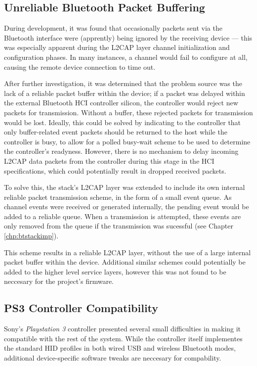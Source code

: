 \subsection{Unreliable Bluetooth Packet Buffering}

During development, it was found that occasionally packets sent via the Bluetooth interface were (apprently) being ignored by the receiving device --- this was especially apparent during the L2CAP layer channel initialization and configuration phases. In many instances, a channel would fail to configure at all, causing the remote device connection to time out.

After further investigation, it was determined that the problem source was the lack of a reliable packet buffer within the device; if a packet was delayed within the external Bluetooth HCI controller silicon, the controller would reject new packets for transmission. Without a buffer, these rejected packets for transmission would be lost. Ideally, this could be solved by indicating to the controller that only buffer-related event packets should be returned to the host while the controller is busy, to allow for a polled busy-wait scheme to be used to determine the controller's readyness. However, there is no mechanism to delay incoming L2CAP data packets from the controller during this stage in the HCI specifications, which could potentially result in dropped received packets.

To solve this, the stack's L2CAP layer was extended to include its own internal reliable packet transmission scheme, in the form of a small event queue. As channel events were received or generated internally, the pending event would be added to a reliable queue. When a transmission is attempted, these events are only removed from the queue if the transmission was sucessful (see Chapter \ref{chp:btstackimp}).

This scheme results in a reliable L2CAP layer, without the use of a large internal packet buffer within the device. Additional similar schemes could potentially be added to the higher level service layers, however this was not found to be neccesary for the project's firmware.

\subsection{PS3 Controller Compatibility}

Sony's \textit{Playstation 3} controller presented several small difficulties in making it compatible with the rest of the system. While the controller itself implementes the standard HID profiles in both wired USB and wireless Bluetooth modes, additional device-specific software tweaks are neccesary for compability.

